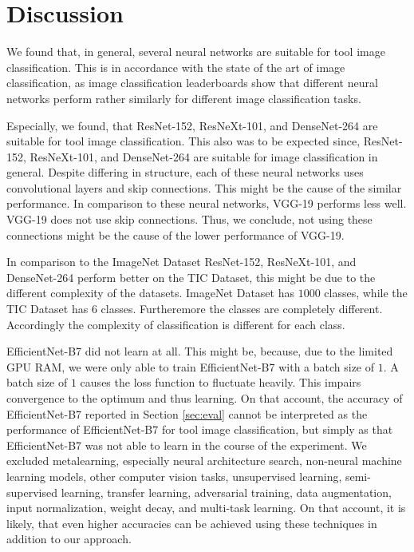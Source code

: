 \documentclass[a4paper, 10pt, journal]{wissarbIEEE}
\begin{document}
\section{Discussion}
\label{sec:discussion}
We found that, in general, several neural networks are suitable for tool image classification. This is in accordance with the state of the art of image classification, as image classification leaderboards show that different neural networks perform rather similarly for different image classification tasks. \cite{imagenet.2019, cifar.2012, mnist.2010, svhn.2011, stl.2011, clothing.2016, fashionMNIST.2017, Darlow.2018, flowers.2008, food.2014, vanHorn.2018, stanfordcars.2013, emnistletters.2017, kuzushijiMNIST.2018, cub.2011, Sabour.2017, isic1.2019, isic2.2018, isic3.2018}
\par
Especially, we found, that ResNet-152, ResNeXt-101, and DenseNet-264 are suitable for tool image classification. This also was to be expected since, ResNet-152, ResNeXt-101, and DenseNet-264 are suitable for image classification in general. \cite{Xie.2017, He.2016, Huang.2017} Despite differing in structure, each of these neural networks uses convolutional layers and skip connections. \cite{Xie.2017, He.2016, Huang.2017} This might be the cause of the similar performance. In comparison to these neural networks, VGG-19 performs less well. VGG-19 does not use skip connections. \cite{Simonyan.2014} Thus, we conclude, not using these connections might be the cause of the lower performance of VGG-19.
\par
In comparison to the ImageNet Dataset ResNet-152, ResNeXt-101, and DenseNet-264 perform better on the TIC Dataset, this might be due to the different complexity of the datasets. ImageNet Dataset has $1000$ classes, while the TIC Dataset has $6$ classes. Furtheremore the classes are completely different. Accordingly the complexity of classification is different for each class.
\par
EfficientNet-B7 did not learn at all. This might be, because, due to the limited GPU RAM, we were only able to train EfficientNet-B7 with a batch size of $1$. A batch size of $1$ causes the loss function to fluctuate heavily. This impairs convergence to the optimum and thus learning.\cite{Ruder.2016} On that account, the accuracy of EfficientNet-B7 reported in Section \ref{sec:eval} cannot be interpreted as the performance of EfficientNet-B7 for tool image classification, but simply as that EfficientNet-B7 was not able to learn in the course of the experiment.
We excluded metalearning, especially neural architecture search, non-neural machine learning models, other computer vision tasks, unsupervised learning, semi-supervised learning, transfer learning, adversarial training, data augmentation, input normalization, weight decay, and multi-task learning. On that account, it is likely, that even higher accuracies can be achieved using these techniques in addition to our approach.
\end{document}
